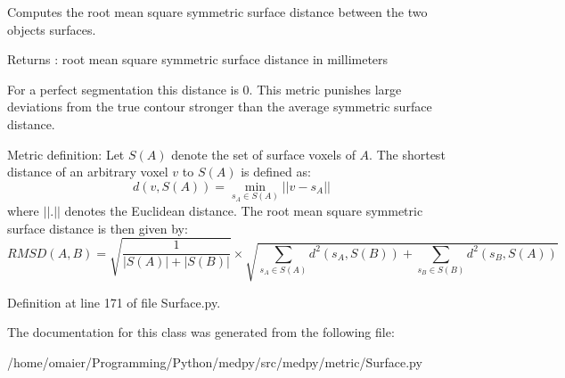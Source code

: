 Computes the root mean square symmetric surface distance between the two objects surfaces. 

\begin{DoxyReturn}{Returns}
: root mean square symmetric surface distance in millimeters
\end{DoxyReturn}
For a perfect segmentation this distance is 0. This metric punishes large deviations from the true contour stronger than the average symmetric surface distance.

Metric definition: Let $S(A)$ denote the set of surface voxels of $A$. The shortest distance of an arbitrary voxel $v$ to $S(A)$ is defined as: \[ d(v,S(A)) = \min_{s_A\in S(A)} ||v-s_A|| \] where $||.||$ denotes the Euclidean distance. The root mean square symmetric surface distance is then given by: \[ RMSD(A,B) = \sqrt{\frac{1}{|S(A)|+|S(B)|}} \times \sqrt{ \sum_{s_A\in S(A)} d^2(s_A,S(B)) + \sum_{s_B\in S(B)} d^2(s_B,S(A)) } \] 

Definition at line 171 of file Surface.py.



The documentation for this class was generated from the following file:\begin{DoxyCompactItemize}
\item 
/home/omaier/Programming/Python/medpy/src/medpy/metric/Surface.py\end{DoxyCompactItemize}
